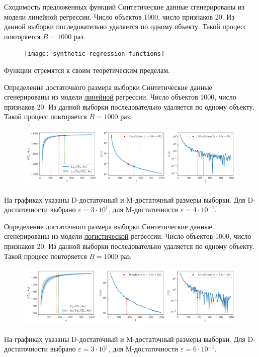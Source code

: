 \documentclass[10pt]{beamer}
\begin{document}
\begin{frame}{Сходимость предложенных функций}
    Синтетические данные сгенерированы из модели линейной регрессии. Число объектов 1000, число признаков 20. Из данной выборки последовательно удаляется по одному объекту. Такой процесс повторяется $B=1000$ раз.
    \vfill
    \begin{figure}[h!]
        \centering
        \texttt{[image: synthetic-regression-functions]}
    \end{figure}
    \vfill
    Функции стремятся к своим теоретическим пределам.
\end{frame}
\begin{frame}{Определение достаточного размера выборки}
    Синтетические данные сгенерированы из модели \underline{линейной} регрессии. Число объектов 1000, число признаков 20. Из данной выборки последовательно удаляется по одному объекту. Такой процесс повторяется $B=1000$ раз.
    \vfill
    \begin{figure}[h!]
        \centering
        \includegraphics[width=\textwidth]{synthetic-regression-sufficient}
    \end{figure}
    \vfill
    На графиках указаны D-достаточный и M-достаточный размеры выборки. Для D-достаточности выбрано $\varepsilon = 3 \cdot 10^{1}$, для M-достаточности $\varepsilon = 4 \cdot 10^{-1}$.
\end{frame}
\begin{frame}{Определение достаточного размера выборки}
    Синтетические данные сгенерированы из модели \underline{логистической} регрессии. Число объектов 1000, число признаков 20. Из данной выборки последовательно удаляется по одному объекту. Такой процесс повторяется $B=1000$ раз.
    \vfill
    \begin{figure}[h!]
        \centering
        \includegraphics[width=\textwidth]{synthetic-classification-sufficient}
    \end{figure}
    \vfill
    На графиках указаны D-достаточный и M-достаточный размеры выборки. Для D-достаточности выбрано $\varepsilon = 3 \cdot 10^{1}$, для M-достаточности $\varepsilon = 6 \cdot 10^{-1}$.
\end{frame}
\end{document}
